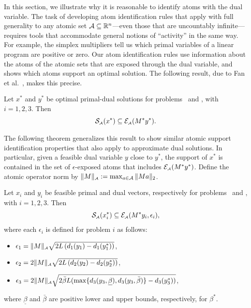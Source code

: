 In this section, we illustrate why it is reasonable to identify atoms with the dual variable. The task of developing atom identification rules that apply with full generality to any atomic set $\mathcal{A}\subseteq\mathbb{R}^n$---even those that are uncountably infinite---requires tools that accommodate general notions of ``activity'' in
the same way. For example, the simplex multipliers tell us which primal
variables of a linear program are positive or zero. Our atom identification rules use information about the atoms of the atomic sets that are exposed through the dual variable, and shows which atoms support an optimal solution. The following
result, due to Fan et al.~\cite[Proposition~4.5 and Theorem~5.1]{fan2019alignment}, makes this precise.
\begin{theorem}\label{thm:opt_supp_id} Let
  $x^*$ and $ y^*$ be optimal primal-dual solutions for problems \Probi~and \Drobi, with
  $i=1,2,3$. Then
  \[\operatorname{\mathcal{S}_{\scriptscriptstyle\mathcal{A}}}(x^*) \subseteq \mathcal{E}_{\scriptscriptstyle\mathcal{A}}(M^*y^*). \]
\end{theorem}

The following theorem generalizes this result to show similar atomic support identification properties that also apply to approximate dual solutions. In particular, given a feasible dual variable $y$ close to $y^*$, the support of $x^*$ is contained in the set of $\epsilon$-exposed atoms that includes $\mathcal{E}_{\scriptscriptstyle\mathcal{A}}(M^*y^*)$. Define the atomic operator norm by $\|M\|_{\scriptscriptstyle\mathcal{A}}:=\max_{a\in\mathcal{A}}\|Ma\|_2$.

\begin{theorem}\label{thm:p0}
    Let $x_i$ and $y_i$ be feasible primal and dual vectors, respectively for
    problems \Probi\ and \Drobi, with $i = 1, 2, 3$. Then
    \begin{equation}\label{eq:1} 
      \operatorname{\mathcal{S}_{\scriptscriptstyle\mathcal{A}}}(x_i^*) \subseteq \mathcal{E}_{\scriptscriptstyle\mathcal{A}}(M^*y_i, \epsilon_i),
    \end{equation}
    where each $\epsilon_i$ is defined for problem $i$ as follows:
    \begin{itemize} 
    \item \label{thm:p1} $\epsilon_1 = \|M\|_{\scriptscriptstyle\mathcal{A}}\sqrt{2L \left( d_1(y_1) - d_1(y_1^*) \right)}$,
  
    \item \label{thm:p2} $\epsilon_2 = 2\|M\|_{\scriptscriptstyle\mathcal{A}}\sqrt{2L \left( d_2(y_2) - d_2(y_2^*) \right)}$,
      
    \item \label{thm:p3} $\epsilon_3 = 2\|M\|_{\scriptscriptstyle\mathcal{A}}\sqrt{2\bar{\beta}L (
          \max\{d_3(y_3, \underline{\beta}), d_3(y_3, \bar{\beta})\} - d_3( y_3^* ) ) }$, 
    \end{itemize}
    where $\underline{\beta}$ and $\bar{\beta}$ are positive lower and
    upper bounds, respectively, for $\beta^*$.
\end{theorem}

